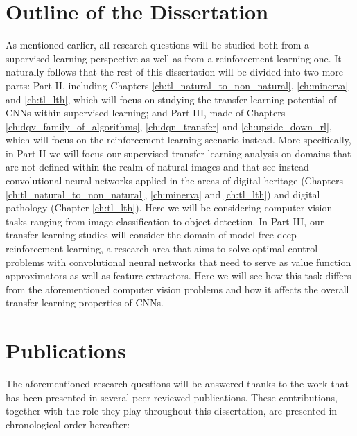 \section{Outline of the Dissertation}


As mentioned earlier, all research questions will be studied both from a supervised learning perspective as well as from a reinforcement learning one. It naturally follows that the rest of this dissertation will be divided into two more parts: Part II, including Chapters \ref{ch:tl_natural_to_non_natural}, \ref{ch:minerva} and \ref{ch:tl_lth}, which will focus on studying the transfer learning potential of CNNs within supervised learning; and Part III, made of Chapters \ref{ch:dqv_family_of_algorithms}, \ref{ch:dqn_transfer} and \ref{ch:upside_down_rl}, which will focus on the reinforcement learning scenario instead. More specifically, in Part II we will focus our supervised transfer learning analysis on domains that are not defined within the realm of natural images and that see instead convolutional neural networks applied in the areas of digital heritage (Chapters \ref{ch:tl_natural_to_non_natural}, \ref{ch:minerva} and \ref{ch:tl_lth}) and digital pathology (Chapter \ref{ch:tl_lth}). Here we will be considering computer vision tasks ranging from image classification to object detection. In Part III, our transfer learning studies will consider the domain of model-free deep reinforcement learning, a research area that aims to solve optimal control problems with convolutional neural networks that need to serve as value function approximators as well as feature extractors. Here we will see how this task differs from the aforementioned computer vision problems and how it affects the overall transfer learning properties of CNNs. 


\section{Publications}

The aforementioned research questions will be answered thanks to the work that has been presented in several peer-reviewed publications. These contributions, together with the role they play throughout this dissertation, are presented in chronological order hereafter:

